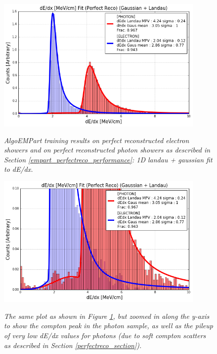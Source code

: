 \begin{figure}[ht!]
\centering
\includegraphics[width=0.9\textwidth]{Figures/EMPartTraining/mc_trained/dEdx_Selected_both.png}\\
\caption{\textit{AlgoEMPart training results on perfect reconstructed electron showers and on perfect reconstructed photon showers as described in Section \ref{empart_perfectreco_performance}: 1D landau + gaussian fit to dE/dx.}}
\label{empart_perfectreco_performance_fig2}
\end{figure}

\begin{figure}[ht!]
\centering
\includegraphics[width=0.9\textwidth]{Figures/EMPartTraining/mc_trained/dEdx_Selected_both_zoomed.png}\\
\caption{\textit{The same plot as shown in Figure \ref{empart_perfectreco_performance_fig2}, but zoomed in along the y-axis to show the compton peak in the photon sample, as well as the pileup of very low dE/dx values for photons (due to soft compton scatters as described in Section \ref{perfectreco_section}).}}
\label{empart_perfectreco_performance_fig3}
\end{figure}

